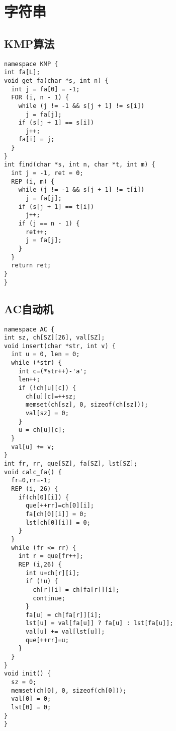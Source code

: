 \section{字符串}

\subsection{KMP算法}

\begin{lstlisting}
namespace KMP {
int fa[L];
void get_fa(char *s, int n) {
  int j = fa[0] = -1;
  FOR (i, n - 1) {
    while (j != -1 && s[j + 1] != s[i])
      j = fa[j];
    if (s[j + 1] == s[i])
      j++;
    fa[i] = j;
  }
}
int find(char *s, int n, char *t, int m) {
  int j = -1, ret = 0;
  REP (i, m) {
    while (j != -1 && s[j + 1] != t[i])
      j = fa[j];
    if (s[j + 1] == t[i])
      j++;
    if (j == n - 1) {
      ret++;
      j = fa[j];
    }
  }
  return ret;
}
}
\end{lstlisting}

\subsection{AC自动机}

\begin{lstlisting}
namespace AC {
int sz, ch[SZ][26], val[SZ];
void insert(char *str, int v) {
  int u = 0, len = 0;
  while (*str) {
    int c=(*str++)-'a';
    len++;
    if (!ch[u][c]) {
      ch[u][c]=++sz;
      memset(ch[sz], 0, sizeof(ch[sz]));
      val[sz] = 0;
    }
    u = ch[u][c];
  }
  val[u] += v;
}
int fr, rr, que[SZ], fa[SZ], lst[SZ];
void calc_fa() {
  fr=0,rr=-1;
  REP (i, 26) {
    if(ch[0][i]) {
      que[++rr]=ch[0][i];
      fa[ch[0][i]] = 0;
      lst[ch[0][i]] = 0;
    }
  }
  while (fr <= rr) {
    int r = que[fr++];
    REP (i,26) {
      int u=ch[r][i];
      if (!u) {
        ch[r][i] = ch[fa[r]][i];
        continue;
      }
      fa[u] = ch[fa[r]][i];
      lst[u] = val[fa[u]] ? fa[u] : lst[fa[u]];
      val[u] += val[lst[u]];
      que[++rr]=u;
    }
  }
}
void init() {
  sz = 0;
  memset(ch[0], 0, sizeof(ch[0]));
  val[0] = 0;
  lst[0] = 0;
}
}
\end{lstlisting}

